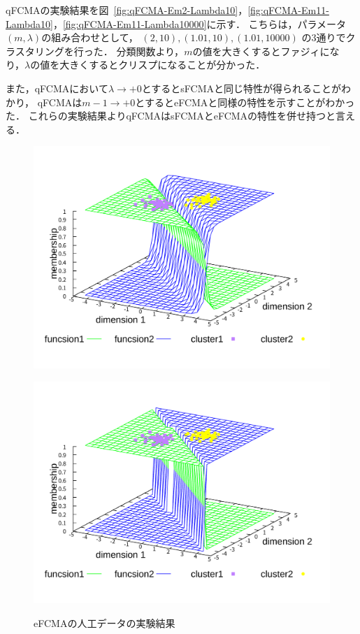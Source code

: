 \documentclass[twocolumn, a4paper]{icethesisabst}
\begin{document}
qFCMAの実験結果を図~\ref{fig:qFCMA-Em2-Lambda10}，\ref{fig:qFCMA-Em11-Lambda10}，\ref{fig:qFCMA-Em11-Lambda10000}に示す．
こちらは，パラメータ$(m, \lambda)$の組み合わせとして，
$(2, 10), (1.01, 10), (1.01, 10000)$
の3通りでクラスタリングを行った．
分類関数より，$m$の値を大きくするとファジィになり，$\lambda$の値を大きくするとクリスプになることが分かった．

また，qFCMAにおいて$\lambda\rightarrow+0$とするとsFCMAと同じ特性が得られることがわかり，
qFCMAは$m-1\rightarrow+0$とするとeFCMAと同様の特性を示すことがわかった．
これらの実験結果よりqFCMAはsFCMAとeFCMAの特性を併せ持つと言える．

\begin{figure}[htbp]
 \centering
 \begin{minipage}{0.43\hsize}
  \includegraphics[width=\linewidth]{eFCMA-Lambda1.pdf}
  \label{fig:eFCMA-Lambda1}
 \end{minipage}
 \begin{minipage}{0.43\hsize}
  \includegraphics[width=\linewidth]{eFCMA-Lambda10000.pdf}
  \label{fig:eFCMA-Lambda10000}
 \end{minipage}
 \vspace*{0.5cm}
 \caption{eFCMAの人工データの実験結果}
\end{figure}
\end{document}
